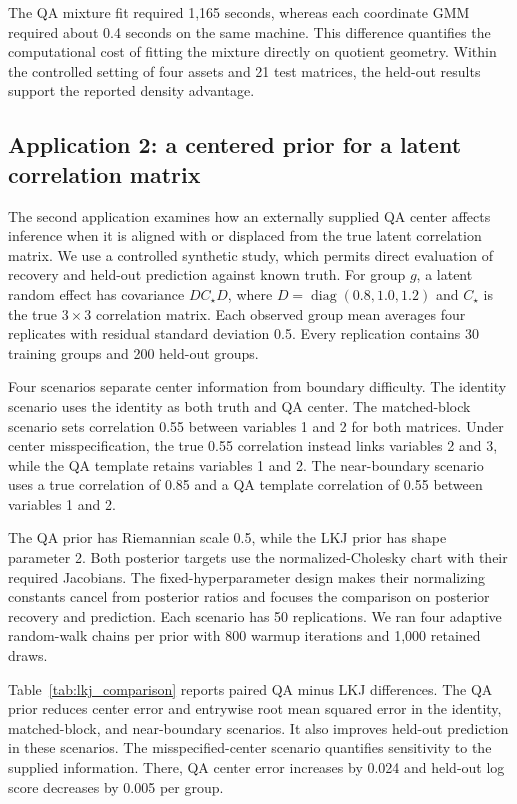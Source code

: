 \documentclass[
  12pt]{article}
\newcommand{\diag}{\operatorname{diag}}
\begin{document}
The QA mixture fit required 1,165 seconds, whereas each coordinate GMM required about 0.4 seconds on the same machine. This difference quantifies the computational cost of fitting the mixture directly on quotient geometry. Within the controlled setting of four assets and 21 test matrices, the held-out results support the reported density advantage.


\subsection{Application 2: a centered prior for a latent correlation matrix}\label{sec:lkj_application}

The second application examines how an externally supplied QA center affects inference when it is aligned with or displaced from the true latent correlation matrix. We use a controlled synthetic study, which permits direct evaluation of recovery and held-out prediction against known truth. For group $g$, a latent random effect has covariance $D C_\star D$, where $D=\diag(0.8,1.0,1.2)$ and $C_\star$ is the true $3\times3$ correlation matrix. Each observed group mean averages four replicates with residual standard deviation 0.5. Every replication contains 30 training groups and 200 held-out groups.

Four scenarios separate center information from boundary difficulty. The identity scenario uses the identity as both truth and QA center. The matched-block scenario sets correlation 0.55 between variables 1 and 2 for both matrices. Under center misspecification, the true 0.55 correlation instead links variables 2 and 3, while the QA template retains variables 1 and 2. The near-boundary scenario uses a true correlation of 0.85 and a QA template correlation of 0.55 between variables 1 and 2.

The QA prior has Riemannian scale 0.5, while the LKJ prior has shape parameter 2. Both posterior targets use the normalized-Cholesky chart with their required Jacobians. The fixed-hyperparameter design makes their normalizing constants cancel from posterior ratios and focuses the comparison on posterior recovery and prediction. Each scenario has 50 replications. We ran four adaptive random-walk chains per prior with 800 warmup iterations and 1,000 retained draws. 

Table~\ref{tab:lkj_comparison} reports paired QA minus LKJ differences. The QA prior reduces center error and entrywise root mean squared error in the identity, matched-block, and near-boundary scenarios. It also improves held-out prediction in these scenarios. The misspecified-center scenario quantifies sensitivity to the supplied information. There, QA center error increases by 0.024 and held-out log score decreases by 0.005 per group.
\end{document}
